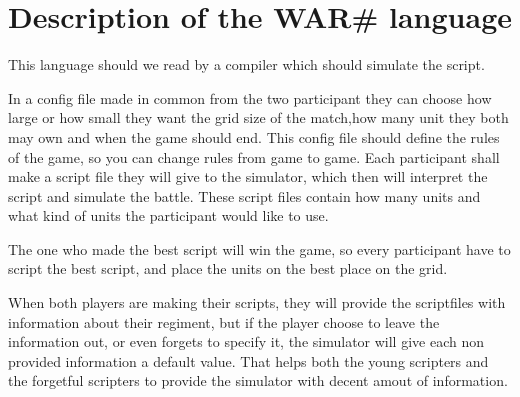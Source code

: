 
\section{ Description of the WAR\# language }

	This language should we read by a compiler which should simulate the script.
	
	In a config file made in common from the two participant they can choose how large or how small 
	they want the grid size of the match,how many unit 	
	they both may own and when the game should end. 
	This config file should define the rules of the game, 
	so you can change rules from game to game.
	Each participant shall make a script file they will give to the simulator, 
	which then will interpret the script and simulate the battle. 
	These script files contain how many units and what kind of units the participant would like to use.

	The one who made the best script will win the game, so every participant have to script the best script, 
	and place the units on the best place on the grid.

When both players are making their scripts, they will provide the scriptfiles with information about their regiment, but if the player choose to leave the information out, or even forgets to specify it, the simulator will give each non provided information a default value. That helps both the young scripters and the forgetful scripters to provide the simulator with decent amout of information.


